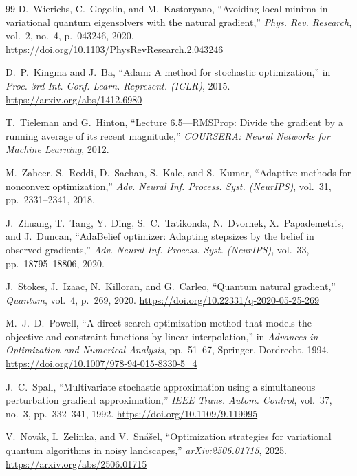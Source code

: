 \documentclass[11pt,a4paper]{article}
\begin{document}
\begin{thebibliography}{99}
D.~Wierichs, C.~Gogolin, and M.~Kastoryano,
\newblock ``Avoiding local minima in variational quantum eigensolvers with the natural gradient,''
\newblock \emph{Phys. Rev. Research}, vol.~2, no.~4, p.~043246, 2020. \url{https://doi.org/10.1103/PhysRevResearch.2.043246}

D.~P.~Kingma and J.~Ba,
\newblock ``Adam: A method for stochastic optimization,''
\newblock in \emph{Proc. 3rd Int. Conf. Learn. Represent. (ICLR)}, 2015. \url{https://arxiv.org/abs/1412.6980}

T.~Tieleman and G.~Hinton,
\newblock ``Lecture 6.5---RMSProp: Divide the gradient by a running average of its recent magnitude,''
\newblock \emph{COURSERA: Neural Networks for Machine Learning}, 2012.

M.~Zaheer, S.~Reddi, D.~Sachan, S.~Kale, and S.~Kumar,
\newblock ``Adaptive methods for nonconvex optimization,''
\newblock \emph{Adv. Neural Inf. Process. Syst. (NeurIPS)}, vol.~31, pp.~2331--2341, 2018.

J.~Zhuang, T.~Tang, Y.~Ding, S.~C.~Tatikonda, N.~Dvornek, X.~Papademetris, and J.~Duncan,
\newblock ``AdaBelief optimizer: Adapting stepsizes by the belief in observed gradients,''
\newblock \emph{Adv. Neural Inf. Process. Syst. (NeurIPS)}, vol.~33, pp.~18795--18806, 2020.

J.~Stokes, J.~Izaac, N.~Killoran, and G.~Carleo,
\newblock ``Quantum natural gradient,''
\newblock \emph{Quantum}, vol.~4, p.~269, 2020. \url{https://doi.org/10.22331/q-2020-05-25-269}

M.~J.~D.~Powell,
\newblock ``A direct search optimization method that models the objective and constraint functions by linear interpolation,''
\newblock in \emph{Advances in Optimization and Numerical Analysis}, pp.~51--67, Springer, Dordrecht, 1994. \url{https://doi.org/10.1007/978-94-015-8330-5_4}

J.~C.~Spall,
\newblock ``Multivariate stochastic approximation using a simultaneous perturbation gradient approximation,''
\newblock \emph{IEEE Trans. Autom. Control}, vol.~37, no.~3, pp.~332--341, 1992. \url{https://doi.org/10.1109/9.119995}

V.~Nov{\'a}k, I.~Zelinka, and V.~Sn{\'a}{\v{s}}el,
\newblock ``Optimization strategies for variational quantum algorithms in noisy landscapes,''
\newblock \emph{arXiv:2506.01715}, 2025. \url{https://arxiv.org/abs/2506.01715}


\end{thebibliography}
\end{document}
